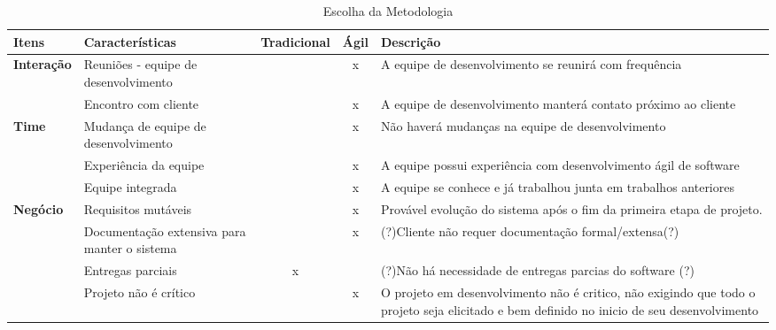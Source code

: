 	\begin{table}[hbpt]
	\huge
		\begin{adjustbox}{width=1.2\textwidth}
			\begin{tabular}{|l|l|c|c|p{10cm}|}
				\hline
				\textbf{Itens} & \textbf{Características} & \textbf{Tradicional} & \textbf{Ágil} & \textbf{Descrição} \\ \hline
				\multicolumn{ 1}{|l|}{\textbf{Interação}} & Reuniões - equipe de desenvolvimento &  & x & A equipe de desenvolvimento se reunirá com frequência \\ \cline{ 2- 5}
				\multicolumn{ 1}{|l|}{} & Encontro com cliente &  & x & A equipe de desenvolvimento manterá contato próximo ao cliente \\ \hline
				\multicolumn{ 1}{|l|}{\textbf{Time}} & Mudança de equipe de desenvolvimento &  & x & Não haverá mudanças na equipe de desenvolvimento \\ \cline{ 2- 5}
				\multicolumn{ 1}{|l|}{} & Experiência da equipe &  & x & A equipe possui experiência com desenvolvimento ágil de software \\ \cline{ 2- 5}
				\multicolumn{ 1}{|l|}{} & Equipe integrada &  & x & A equipe se conhece e já trabalhou junta em trabalhos anteriores \\ \hline
				\multicolumn{ 1}{|l|}{\textbf{Negócio}} & Requisitos mutáveis &  & x & Provável evolução do sistema após o fim da primeira etapa de projeto. \\ \cline{ 2- 5}
				\multicolumn{ 1}{|l|}{} & Documentação extensiva para manter o sistema &  & x & (?)Cliente não requer documentação formal/extensa(?) \\ \cline{ 2- 5}
				\multicolumn{ 1}{|l|}{} & Entregas parciais & x &  & (?)Não há necessidade de entregas parcias do software (?) \\ \cline{ 2- 5}
				\multicolumn{ 1}{|l|}{} & Projeto não é crítico &  & x & O projeto em desenvolvimento não é critico, não exigindo que todo o projeto seja elicitado e bem definido no inicio de seu desenvolvimento \\ \hline
			\end{tabular}
		\end{adjustbox}
		\caption{Escolha da Metodologia}
		\label{Escolha da Metodologia}
	\end{table}

	 


